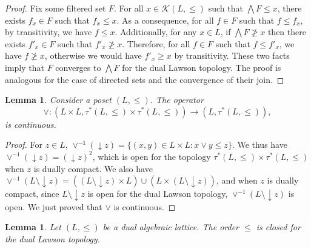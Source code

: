 \documentclass{article}
\newcommand{\comm}[2]{\begin{tcolorbox}[colback=gray!40]\textbf{Comment} (#1) : #2\end{tcolorbox}}
\newtheorem{lemma}[theorem]{Lemma}
\begin{document}
\begin{proof}
    Fix some filtered set $F$. For all $x \in \mathcal{K}(L,\le)$ such that $\bigwedge F \le x$, there exists $f_x \in F$ such that $f_x \le x$.
    As a consequence, for all $f \in F$ such that $f \le f_x$, by transitivity, we have $f \le x$. Additionally, for any $x \in L$, if $\bigwedge F \not \ge x$ then there exists $f'_x \in F$ such that $f'_x \not \ge x$. Therefore, for all $f \in F$ such that $f \le f'_x$, we have $f \not \ge x$, otherwise we would have $f'_x \ge x$ by transitivity.     
    These two facts imply that $F$ converges to $\bigwedge F$ for the dual Lawson topology. The proof is analogous for the case of directed sets and the convergence of their join.
\end{proof}

\begin{lemma}\label{lemma.vee.continuous}
    {Consider a poset $(L,\le)$. The operator $$\vee : (L \times L, \tau^*(L,\le) \times \tau^*(L,\le)) \rightarrow (L,\tau^*(L,\le)),$$ is continuous.}
\end{lemma}

\begin{proof}
    {For $z \in L$, 
    $\vee^{-1}(\mathop{\downarrow}z) = \{(x,y) \in L \times L : x \vee y \le z \}$. 
    We thus have $\vee^{-1}(\mathop{\downarrow}z) = (\mathop{\downarrow}z)^2$, which is open for the topology $\tau^*(L,\le) \times \tau^*(L,\le)$ when $z$ is dually compact. We also have $\vee^{-1}(L \setminus \mathop{\downarrow}z) = ((L \setminus \mathop{\downarrow}z) \times L ) \cup (L \times (L \setminus \mathop{\downarrow}z))$, and when $z$ is dually compact,  since $L \setminus \mathop{\downarrow}z$ is open for the dual Lawson topology, $\vee^{-1}(L \setminus \mathop{\downarrow}z)$ is open. We just proved that $\vee$ is continuous.}
\end{proof}
\begin{lemma}\label{lemma.order.closed}
    {Let $(L,\le)$ be a dual algebraic lattice. The order $\le$ is closed for the dual Lawson topology.}
\end{lemma}
\end{document}
